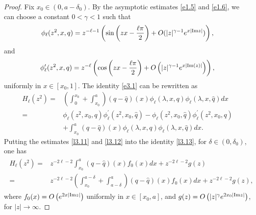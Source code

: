 \documentclass[reqno,12pt,centertags]{amsart}
\numberwithin{equation}{section}
\theoremstyle{definition}
\begin{document}
\begin{proof}
Fix $x_0\in(0, a-\delta_0)$.
By the asymptotic estimates \eqref{e1.5} and \eqref{e1.6}, we can choose a constant $0<\gamma<1$ such that 
\begin{equation}\label{l3.11}
\phi_{\ell}(z^2, x, q)
=z^{-\ell-1}\left(\sin \left(z x-\frac{\ell\pi}{2}\right)
+O(|z|^{\gamma-1}e^{x|\textnormal{Im}z|})\right),
\end{equation}
and
\begin{equation}\label{l3.12}
\phi_{\ell}^{\prime}(z^2, x, q)
=z^{-\ell}
\left(\cos \left(zx-\frac{\ell \pi}{2}\right)+O\left(|z|^{\gamma-1} e^{x|\textnormal{Im}(z)|}\right)\right),
\end{equation}
uniformly in $x\in[x_0,1]$. The identity \eqref{e3.1} can be rewritten as
\begin{equation}\label{l3.13}
\begin{split}
H_{\ell}(z^2)=&\left(\int_{0}^{x_0}+\int_{x_0}^{a}\right)(q-\hat{q})(x)\phi_{\ell}(\lambda, x, q) \phi_{\ell}(\lambda, x, \hat{q})dx\\
=&\phi_{\ell}(z^2,x_0,q)\phi_{\ell}^{\prime}(z^2,x_0,\hat{q})-\phi_{\ell}(z^2,x_0,\hat{q})\phi_{\ell}^{\prime}(z^2,x_0,q)\\
&+\int_{x_0}^{a}(q-\hat{q})(x)\phi_{\ell}(\lambda, x, q) \phi_{\ell}(\lambda, x, \hat{q})dx.
\end{split}
\end{equation}
Putting the estimates \eqref{l3.11} and \eqref{l3.12} into the identity \eqref{l3.13}, for $\delta\in(0,\delta_{0})$, one has
\begin{align}\label{e3.3}
\begin{split}
H_{\ell}(z^2)= &z^{-2 \ell-2}\int_{x_0}^{a}(q-\hat{q})(x)f_0(x)dx+z^{-2\ell-2}g(z)\\
= &z^{-2 \ell-2}\left(\int_{x_0}^{a-\delta}+\int_{a-\delta}^{a}\right)
(q-\hat{q})(x)f_0(x)dx+z^{-2\ell-2}g(z),
\end{split}
\end{align}
where $f_0(x)=O\left(e^{2x|\textnormal{Im}z|}\right)$ uniformly in $x\in[x_0,a]$, and $g(z)=O\left(|z|^{\gamma}e^{2x_0|\textnormal{Im}z|}\right)$, 
for $|z|\rightarrow\infty$. 


\end{proof}
\end{document}
